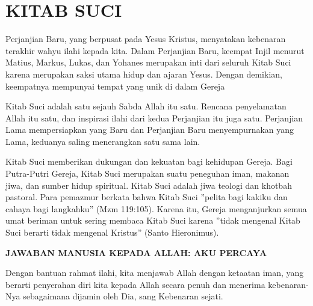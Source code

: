 \newpage
{}
\setcounter{kgkcounter}{21}
{\normalsize
\section*{KITAB SUCI}

Perjanjian Baru, yang berpusat pada Yesus Kristus, menyatakan kebenaran
terakhir wahyu ilahi kepada kita. Dalam Perjanjian Baru, keempat Injil menurut
Matius, Markus, Lukas, dan Yohanes merupakan inti dari seluruh Kitab Suci
karena merupakan saksi utama hidup dan ajaran Yesus. Dengan demikian,
keempatnya mempunyai tempat yang unik di dalam Gereja

     Kitab Suci adalah satu sejauh Sabda Allah itu satu. Rencana penyelamatan              
Allah itu satu, dan inspirasi ilahi dari kedua Perjanjian itu juga satu. Perjanjian Lama   
mempersiapkan yang Baru dan Perjanjian Baru menyempurnakan yang Lama,
keduanya saling menerangkan satu sama lain.

     Kitab Suci memberikan dukungan dan kekuatan bagi kehidupan Gereja. Bagi               
Putra-Putri Gereja, Kitab Suci merupakan suatu peneguhan iman, makanan jiwa,               
dan sumber hidup spiritual. Kitab Suci adalah jiwa teologi dan khotbah pastoral.
Para pemazmur berkata bahwa Kitab Suci ”pelita bagi kakiku dan cahaya bagi
langkahku” (Mzm 119:105). Karena itu, Gereja menganjurkan semua umat beriman
untuk sering membaca Kitab Suci karena ”tidak mengenal Kitab Suci berarti tidak
mengenal Kristus” (Santo Hieronimus).

\begin{center}\textbf{JAWABAN MANUSIA KEPADA ALLAH: AKU PERCAYA} \end{center}

     Dengan bantuan rahmat ilahi, kita menjawab Allah dengan ketaatan iman, yang
berarti penyerahan diri kita kepada Allah secara penuh dan menerima kebenaran-
Nya sebagaimana dijamin oleh Dia, sang Kebenaran sejati.


}